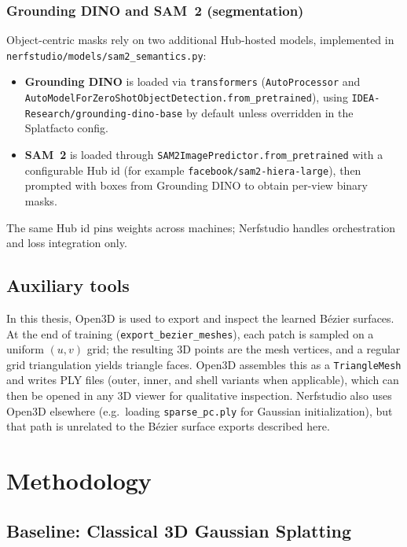 \documentclass{report}
\newcommand{\filepath}[1]{\nolinkurl{#1}}
\newcommand{\codeid}[1]{\nolinkurl{#1}}
\begin{document}
\subsection{Grounding DINO and SAM~2 (segmentation)}
Object-centric masks rely on two additional Hub-hosted models, implemented in \filepath{nerfstudio/models/sam2\_semantics.py}:
\begin{itemize}
    \item \textbf{Grounding DINO} is loaded via \texttt{transformers} (\texttt{Auto\-Processor} and \texttt{Auto\-Model\-For\-Zero\-Shot\-Object\-Detection.from\_pretrained}), using \codeid{IDEA-Research/grounding-dino-base} by default unless overridden in the Splatfacto config.
    \item \textbf{SAM~2} is loaded through \texttt{SAM2\-Image\-Predictor.from\_pretrained} with a configurable Hub id (for example \codeid{facebook/sam2-hiera-large}), then prompted with boxes from Grounding DINO to obtain per-view binary masks.
\end{itemize}
The same Hub id pins weights across machines; Nerfstudio handles orchestration and loss integration only.

\section{Auxiliary tools}

In this thesis, Open3D \cite{zhou2018open3d} is used to export and inspect the learned B\'ezier surfaces. At the end of training (\texttt{export\_bezier\_meshes}), each patch is sampled on a uniform $(u,v)$ grid; the resulting 3D points are the mesh vertices, and a regular grid triangulation yields triangle faces. Open3D assembles this as a \texttt{TriangleMesh} and writes PLY files (outer, inner, and shell variants when applicable), which can then be opened in any 3D viewer for qualitative inspection. Nerfstudio also uses Open3D elsewhere (e.g.\ loading \filepath{sparse\_pc.ply} for Gaussian initialization), but that path is unrelated to the B\'ezier surface exports described here.

\chapter{Methodology}
\label{chap:methodology}

\section{Baseline: Classical 3D Gaussian Splatting}
\label{sec:baseline_3dgs}
\end{document}
